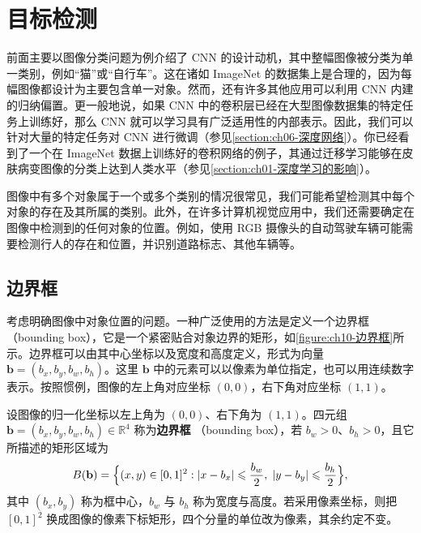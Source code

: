 \documentclass[../../main.tex]{subfiles}
\begin{document}
\section{目标检测}\label{section:ch10-目标检测}

前面主要以图像分类问题为例介绍了 CNN 的设计动机，其中整幅图像被分类为单一类别，例如“猫”或“自行车”。这在诸如 ImageNet 的数据集上是合理的，因为每幅图像都设计为主要包含单一对象。然而，还有许多其他应用可以利用 CNN 内建的归纳偏置。更一般地说，如果 CNN 中的卷积层已经在大型图像数据集的特定任务上训练好，那么 CNN 就可以学习具有广泛适用性的内部表示。因此，我们可以针对大量的特定任务对 CNN 进行微调（参见\cref{section:ch06-深度网络}）。你已经看到了一个在 ImageNet 数据上训练好的卷积网络的例子，其通过迁移学习能够在皮肤病变图像的分类上达到人类水平（参见\cref{section:ch01-深度学习的影响}）。

图像中有多个对象属于一个或多个类别的情况很常见，我们可能希望检测其中每个对象的存在及其所属的类别。此外，在许多计算机视觉应用中，我们还需要确定在图像中检测到的任何对象的位置。例如，使用 RGB 摄像头的自动驾驶车辆可能需要检测行人的存在和位置，并识别道路标志、其他车辆等。

\subsection{边界框}\label{subsection:ch10-边界框}

考虑明确图像中对象位置的问题。一种广泛使用的方法是定义一个边界框（bounding box），它是一个紧密贴合对象边界的矩形，如\cref{figure:ch10-边界框}所示。边界框可以由其中心坐标以及宽度和高度定义，形式为向量 $\mathbf{b}=(b_x,b_y,b_w,b_h)$。这里 $\mathbf{b}$ 中的元素可以以像素为单位指定，也可以用连续数字表示。按照惯例，图像的左上角对应坐标 $(0,0)$，右下角对应坐标 $(1,1)$。

\begin{definition}[边界框]\label{definition:ch10-边界框}
设图像的归一化坐标以左上角为 $(0,0)$、右下角为 $(1,1)$。四元组
$\mathbf{b}=(b_x,b_y,b_w,b_h)\in\mathbb{R}^{4}$ 称为\textbf{边界框}
（bounding box），若 $b_w>0$、$b_h>0$，且它所描述的矩形区域为
\begin{align*}
  B(\mathbf{b})=\Bigl\{(x,y)\in[0,1]^{2}:
  |x-b_x|\leqslant\frac{b_w}{2},\;
  |y-b_y|\leqslant\frac{b_h}{2}\Bigr\},
\end{align*}
其中 $(b_x,b_y)$ 称为框中心，$b_w$ 与 $b_h$ 称为宽度与高度。若采用像素坐标，则把
$[0,1]^{2}$ 换成图像的像素下标矩形，四个分量的单位改为像素，其余约定不变。
\end{definition}
\end{document}
